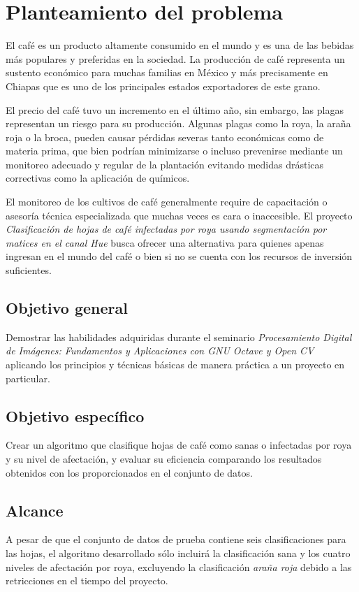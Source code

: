 \chapter{Planteamiento del problema}
El café es un producto altamente consumido en el mundo y es una de las bebidas más populares y preferidas en la sociedad. La producción de café representa un sustento económico para muchas familias en México y más precisamente en Chiapas que es uno de los principales estados exportadores de este grano.

El precio del café tuvo un incremento en el último año, sin embargo, las plagas representan un riesgo para su producción. Algunas plagas como la roya, la araña roja o la broca, pueden causar pérdidas severas tanto económicas como de materia prima, que bien podrían minimizarse o incluso prevenirse mediante un monitoreo adecuado y regular de la plantación evitando medidas drásticas correctivas como la aplicación de químicos.

El monitoreo de los cultivos de café generalmente require de capacitación o asesoría técnica especializada que muchas veces es cara o inaccesible. El proyecto \textit{Clasificación de hojas de café infectadas por roya usando segmentación por matices en el canal Hue} busca ofrecer una alternativa para quienes apenas ingresan en el mundo del café o bien si no se cuenta con los recursos de inversión suficientes.

\section{Objetivo general}
Demostrar las habilidades adquiridas durante el seminario \textit{Procesamiento Digital de Imágenes: Fundamentos y Aplicaciones con GNU Octave y Open CV} aplicando los principios y técnicas básicas de manera práctica a un proyecto en particular.

\section{Objetivo específico}
Crear un algoritmo que clasifique hojas de café como sanas o infectadas por roya y su nivel de afectación, y evaluar su eficiencia comparando los resultados obtenidos con los proporcionados en el conjunto de datos.

\section{Alcance}
A pesar de que el conjunto de datos de prueba contiene seis clasificaciones para las hojas, el algoritmo desarrollado sólo incluirá la clasificación sana y los cuatro niveles de afectación por roya, excluyendo la clasificación \textit{araña roja} debido a las retricciones en el tiempo del proyecto.

